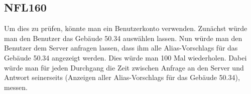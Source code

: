 \subsection*{NFL160}
Um dies zu prüfen, könnte man ein \Gls{Benutzer}konto verwenden. Zunächst würde man den \Gls{Benutzer} das Gebäude 50.34 auswählen lassen. Nun würde man den \Gls{Benutzer} dem \Gls{Server} anfragen lassen, dass ihm alle \Glspl{Alias-Vorschlag} für das Gebäude 50.34 angezeigt werden. Dies würde man 100 Mal wiederholen. Dabei würde man für jeden Durchgang die Zeit zwischen Anfrage an den \Gls{Server} und Antwort seinerseits (Anzeigen aller \Glspl{Alias-Vorschlag} für das Gebäude 50.34), messen.
